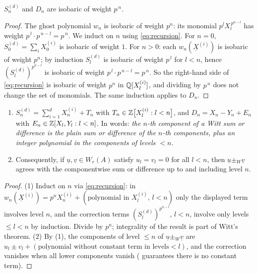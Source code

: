 \documentclass[11pt]{article}
\newcommand{\wv}[1]{\underline{#1}}                 %
\begin{document}
\begin{lemma}[isobaricity]\label{lem:isobaric}
$S^{(d)}_n$ and $D_n$ are isobaric of weight $p^{\,n}$.
\end{lemma}

\begin{proof}
The ghost polynomial $w_n$ is isobaric of weight $p^n$: its monomial
$p^lX_l^{\,p^{n-l}}$ has weight $p^{\,l}\cdot p^{\,n-l}=p^{\,n}$.  We induct
on $n$ using \cref{eq:recursion}.  For $n=0$,
$S^{(d)}_0=\sum_iX^{(i)}_0$ is isobaric of weight $1$.  For $n>0$: each
$w_n(\wv X^{(i)})$ is isobaric of weight $p^n$; by induction $S^{(d)}_l$ is
isobaric of weight $p^{\,l}$ for $l<n$, hence $(S^{(d)}_l)^{p^{n-l}}$ is
isobaric of weight $p^{\,l}\cdot p^{\,n-l}=p^{\,n}$.  So the right-hand side
of \cref{eq:recursion} is isobaric of weight $p^n$ in $\mathbb{Q}[X^{(i)}_l]$, and
dividing by $p^{\,n}$ does not change the set of monomials.  The same
induction applies to $D_n$.
\end{proof}

\begin{lemma}[triangularity]\label{lem:triangular}
\begin{enumerate}
  \item $S^{(d)}_n=\sum_{i=1}^{d}X^{(i)}_n+T_n$ with
        $T_n\in\mathbb{Z}\big[X^{(i)}_l : l<n\big]$, and
        $D_n=X_n-Y_n+E_n$ with $E_n\in\mathbb{Z}[X_l,Y_l : l<n]$.
        In words: \emph{the $n$-th component of a Witt sum or difference is
        the plain sum or difference of the $n$-th components, plus an
        integer polynomial in the components of levels $<n$.}
  \item Consequently, if $\wv u,\wv v\in W_r(A)$ satisfy $u_l=v_l=0$ for all
        $l<n$, then $\wv u\pm_W\wv v$ agrees with the componentwise sum or
        difference up to and including level $n$.
\end{enumerate}
\end{lemma}

\begin{proof}
(1) Induct on $n$ via \cref{eq:recursion}: in
$w_n(\wv X^{(i)})=p^nX^{(i)}_n+(\text{polynomial in }X^{(i)}_{l},\,l<n)$
only the displayed term involves level $n$, and the correction terms
$(S^{(d)}_l)^{p^{n-l}}$, $l<n$, involve only levels $\le l<n$ by induction.
Divide by $p^n$; integrality of the result is part of Witt's theorem.
(2) By (1), the components of level $\le n$ of $\wv u\pm_W \wv v$ are
$u_l\pm v_l+(\text{polynomial without constant term in levels}<l)$,
and the correction vanishes when all lower components vanish
( guarantees there is no constant term).
\end{proof}
\end{document}

